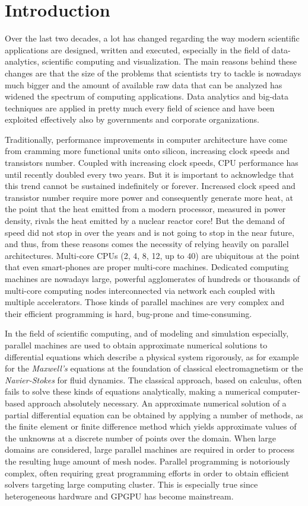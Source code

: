 \chapter{Introduction}


Over the last two decades, a lot has changed regarding the way modern scientific applications are designed, written and executed, especially in the field of data-analytics, scientific computing and visualization. The main reasons behind these changes are that the size of the problems that scientists try to tackle is nowadays much bigger and the amount of available raw data that can be analyzed has widened the spectrum of computing applications.
Data analytics and big-data techniques are applied in pretty much every field of science and have been exploited effectively also by governments and corporate organizations.

Traditionally, performance improvements in computer architecture have come from cramming more functional units onto silicon, increasing clock speeds and transistors number. Coupled with increasing clock speeds, CPU performance has until recently doubled every two years.  But it is important to acknowledge that this trend cannot be sustained indefinitely or forever. Increased clock speed and transistor number require more power and consequently generate more heat, at the point that the heat emitted from a modern processor, measured in power density, rivals the heat emitted by a nuclear reactor core!
But the demand of speed did not stop in over the years and is not going to stop in the near future,  and thus, from these reasons comes the necessity of relying heavily on parallel architectures.
Multi-core CPUs (2, 4, 8, 12, up to $40$)  are ubiquitous at the point that even smart-phones are proper multi-core machines.
Dedicated computing machines are nowadays large, powerful agglomerates of hundreds or thousands of multi-core computing nodes interconnected via  network each coupled with multiple accelerators.
Those kinds of parallel machines are very complex and their efficient programming is hard, bug-prone and time-consuming. 

In the field of scientific computing, and of modeling and simulation especially, parallel machines are used to obtain approximate numerical solutions to differential equations which describe a physical system rigorously, as for example for the \textit{Maxwell's} equations at the foundation of classical electromagnetism or the \textit{Navier-Stokes} for fluid dynamics.
The classical approach, based on calculus, often fails to solve these kinds of equations analytically, making a numerical computer-based approach absolutely necessary.
An approximate numerical solution of a partial differential equation can be obtained by applying a number of methods, as the finite element or finite difference method which yields approximate values of the unknowns at a discrete number of points over the domain.
When large domains are considered, large parallel machines are required in order to process the resulting huge amount of mesh nodes. Parallel programming is notoriously complex, often requiring great programming efforts in order to obtain efficient solvers targeting large computing cluster. This is especially true since heterogeneous hardware and GPGPU has become mainstream.

